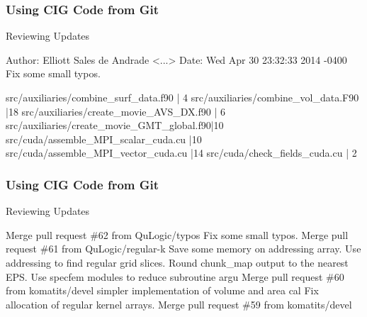 \begin{frame}[fragile,t]
 \frametitle{Using CIG Code from Git}

 \begin{exampleblock}{Reviewing Updates}
  \vspace{-1em}
  \begin{semiverbatim}
Author: Elliott Sales de Andrade <...>
Date:   Wed Apr 30 23:32:33 2014 -0400
    Fix some small typos.

 src/auxiliaries/combine_surf_data.f90      | 4 \hiGreen{+}\hiRed{-}
 src/auxiliaries/combine_vol_data.F90       |18 \hiGreen{++}\hiRed{-{}-}
 src/auxiliaries/create_movie_AVS_DX.f90    | 6 \hiGreen{+}\hiRed{-}
 src/auxiliaries/create_movie_GMT_global.f90|10 \hiGreen{+}\hiRed{-{}-}
 src/cuda/assemble_MPI_scalar_cuda.cu       |10 \hiGreen{+}\hiRed{-{}-}
 src/cuda/assemble_MPI_vector_cuda.cu       |14 \hiGreen{+}\hiRed{-{}-}
 src/cuda/check_fields_cuda.cu              | 2 \hiGreen{+}\hiRed{-}
\end{semiverbatim}
 \end{exampleblock}
\end{frame}

\begin{frame}[fragile,t]
 \frametitle{Using CIG Code from Git}

 \begin{exampleblock}{Reviewing Updates}
  \vspace{-1em}
  \begin{semiverbatim}
 Merge pull request \#62 from QuLogic/typos
 Fix some small typos.
 Merge pull request \#61 from QuLogic/regular-k
 Save some memory on addressing array.
 Use addressing to find regular grid slices.
 Round chunk_map output to the nearest EPS.
 Use specfem modules to reduce subroutine argu
 Merge pull request \#60 from komatits/devel
 simpler implementation of volume and area cal
 Fix allocation of regular kernel arrays.
 Merge pull request \#59 from komatits/devel
\end{semiverbatim}
 \end{exampleblock}
\end{frame}

